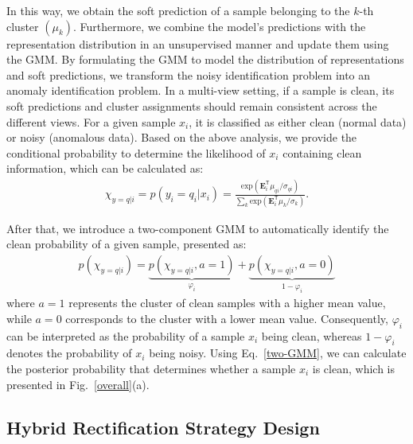 \documentclass{article}
\theoremstyle{plain}
\theoremstyle{definition}
\theoremstyle{remark}
\begin{document}
In this way, we obtain the soft prediction of a sample belonging to the $k$-th cluster $(\mu_k)$. Furthermore, we combine the model's predictions with the representation distribution in an unsupervised manner and update them using the GMM. By formulating the GMM to model the distribution of representations and soft predictions, we transform the noisy identification problem into an anomaly identification problem. In a multi-view setting, if a sample is clean, its soft predictions and cluster assignments should remain consistent across the different views. For a given sample $x_i$, it is classified as either clean (normal data) or noisy (anomalous data). Based on the above analysis, we provide the conditional probability to determine the likelihood of $x_i$ containing clean information, which can be calculated as:
\begin{equation}
\begin{aligned}
\chi_{y=q|i} = p(y_i =q_i|x_i) =\frac{\text{exp}\left ( \textbf{E}_i^\mathsf{T}\mu_{qi}/\sigma_{qi} \right )}{\sum_k{\text{exp}\left ( \textbf{E}_i^\mathsf{T}\mu_{k}/\sigma_{k} \right )}}.
\end{aligned}
\label{clean_pro}
\end{equation}

After that, we introduce a two-component GMM to automatically identify the clean probability of a given sample, presented as:
\begin{equation}
\begin{aligned}
p(\chi_{y=q|i}) = \underset{\varphi_i}{\underbrace{{p(\chi_{y=q|i}, a=1)}}} +  \underset{1 - \varphi_i}{\underbrace{{p(\chi_{y=q|i}, a=0)}}}
\end{aligned}
\label{two-GMM}
\end{equation}
where $a=1$ represents the cluster of clean samples with a higher mean value, while $a=0$ corresponds to the cluster with a lower mean value. Consequently, $\varphi_i$ can be interpreted as the probability of a sample $x_i$ being clean, whereas $1-\varphi_i$ denotes the probability of $x_i$ being noisy. Using Eq.~\eqref{two-GMM}, we can calculate the posterior probability that determines whether a sample $x_i$ is clean, which is presented in Fig.~\ref{overall}(a).

\subsection{Hybrid Rectification Strategy Design}
\end{document}
